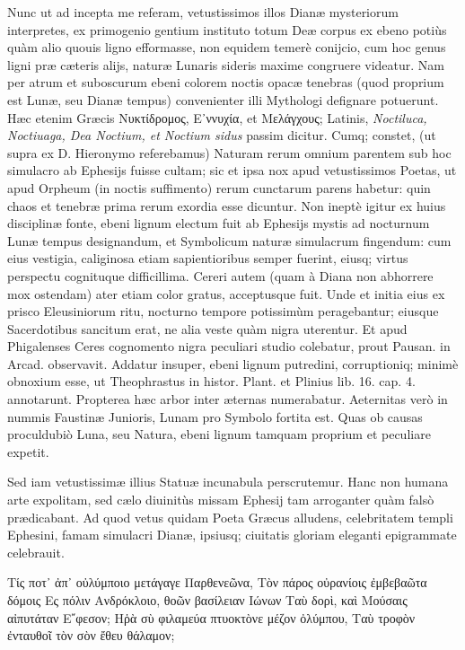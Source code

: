 \documentclass[a4paper, 11pt, oneside, polutonikogreek, latin]{article}
\begin{document}
Nunc ut ad incepta me referam, vetustissimos illos Dianæ mysteriorum interpretes, ex primogenio gentium instituto totum Deæ corpus ex ebeno potiùs quàm alio quouis ligno efformasse, non equidem temerè conijcio, cum hoc genus ligni præ cæteris alijs, naturæ Lunaris sideris maxime congruere videatur. Nam per atrum et suboscurum ebeni colorem noctis opacæ tenebras (quod proprium est Lunæ, seu Dianæ tempus) convenienter illi Mythologi defignare potuerunt. Hæc etenim Græcis Νυκτίδρομος, Ε᾽ννυχία, et Μελάγχους; Latinis, \emph{Noctiluca, Noctiuaga, Dea Noctium, et Noctium sidus} passim dicitur. Cumq; constet, (ut supra ex D. Hieronymo referebamus) Naturam rerum omnium parentem sub hoc simulacro ab Ephesijs fuisse cultam; sic et ipsa nox apud vetustissimos Poetas, ut apud Orpheum (in noctis suffimento) rerum cunctarum parens habetur: quin chaos et tenebræ prima rerum exordia esse dicuntur. Non ineptè igitur ex huius disciplinæ fonte, ebeni lignum electum fuit ab Ephesijs mystis ad nocturnum Lunæ tempus designandum, et Symbolicum naturæ simulacrum fingendum: cum eius vestigia, caliginosa etiam sapientioribus semper fuerint, eiusq; virtus perspectu cognituque difficillima. Cereri autem (quam à Diana non abhorrere mox ostendam) ater etiam color gratus, acceptusque fuit. Unde et initia eius ex prisco Eleusiniorum ritu, nocturno tempore potissimùm peragebantur; eiusque Sacerdotibus sancitum erat, ne alia veste quàm nigra uterentur. Et apud Phigalenses Ceres cognomento nigra peculiari studio colebatur, prout Pausan. in Arcad. observavit. Addatur insuper, ebeni lignum putredini, corruptioniq; minimè obnoxium esse, ut Theophrastus in histor. Plant. et Plinius lib. 16. cap. 4. annotarunt. Propterea hæc arbor inter æternas numerabatur. Aeternitas verò in nummis Faustinæ Junioris, Lunam pro Symbolo fortita est. Quas ob causas proculdubiò Luna, seu Natura, ebeni lignum tamquam proprium et peculiare expetit.

Sed iam vetustissimæ illius Statuæ incunabula perscrutemur. Hanc non humana arte expolitam, sed cælo diuinitùs missam Ephesij tam arroganter quàm falsò prædicabant. Ad quod vetus quidam Poeta Græcus alludens, celebritatem templi Ephesini, famam simulacri Dianæ, ipsiusq; ciuitatis gloriam eleganti epigrammate celebrauit.

Τίς ποτ᾽ ἀπ᾽ οὐλύμποιο μετάγαγε Παρθενεῶνα,
Τὸν πάρος οὐρανίοις ἐμβεβαῶτα δόμοις
Ες πόλιν Ανδρόκλοιο, θοῶν βασίλειαν Ιώνων
Ταὺ δορὶ, καὶ Μούσαις αἰπυτάταν Ε῎φεσον;
Ηῥὰ σὺ φιλαμεύα πτυοκτὸνε μέζον ὀλύμπου,
Ταὺ τροφὸν ἐνταυθοῖ τὸν σὸν ἔθευ θάλαμον;
\end{document}

